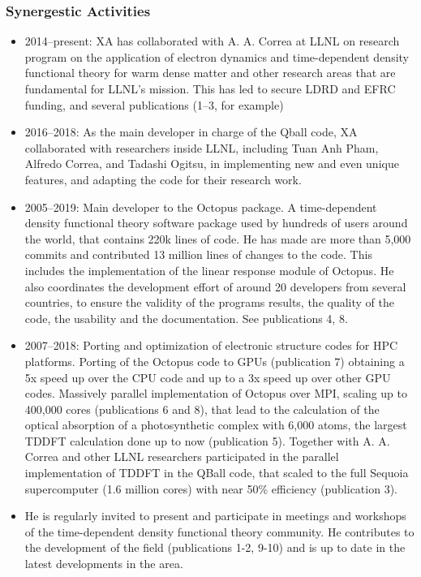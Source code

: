 \subsubsection*{Synergestic Activities}

\begin{itemize}
    \item 2014–present: XA has collaborated with A. A. Correa at LLNL on research program on the application of electron dynamics and time-dependent density functional theory for warm dense matter and other research areas that are fundamental for LLNL’s mission. This has led to secure LDRD and EFRC funding, and several publications (1--3, for example)
    \item 2016–2018: As the main developer in charge of the Qball code, XA collaborated with researchers inside LLNL, including Tuan Anh Pham, Alfredo Correa, and Tadashi Ogitsu, in implementing new and even unique features, and adapting the code for their research work. 
    \item 2005–2019: Main developer to the Octopus package. A time-dependent density functional theory software package used by hundreds of users around the world, that contains 220k lines of code. He has made are more than 5,000 commits and contributed 13 million lines of changes to the code. This includes the implementation of the linear response module of Octopus. He also coordinates the development effort of around 20 developers from several countries, to ensure the validity of the programs results, the quality of the code, the usability and the documentation. See publications 4, 8.
    \item 2007–2018: Porting and optimization of electronic structure codes for HPC platforms. Porting of the Octopus code to GPUs (publication 7) obtaining a 5x speed up over the CPU code and up to a 3x speed up over other GPU codes. Massively parallel implementation of Octopus over MPI, scaling up to 400,000 cores (publications 6 and 8), that lead to the calculation of the optical absorption of a photosynthetic complex with 6,000 atoms, the largest TDDFT calculation done up to now (publication 5). Together with A. A. Correa and other LLNL researchers participated in the parallel implementation of TDDFT in the QBall code, that scaled to the full Sequoia supercomputer (1.6 million cores) with near 50\% efficiency (publication 3).
    \item He is regularly invited to present and participate in meetings and workshops of the time-dependent density functional theory community. He contributes to the development of the field (publications 1-2, 9-10) and is up to date in the latest developments in the area.
\end{itemize}
\clearpage

